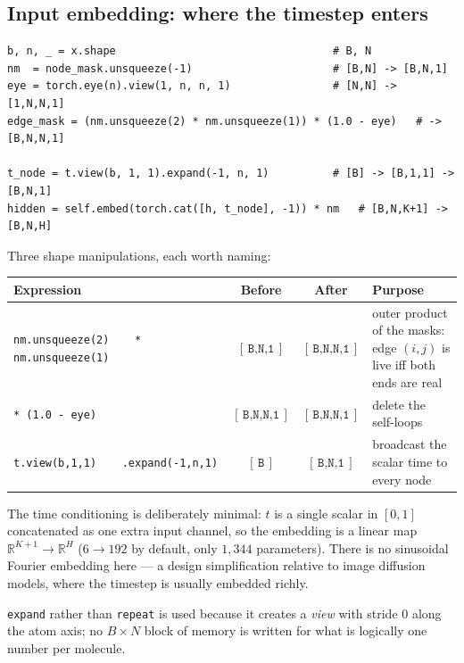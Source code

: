 \documentclass[11pt,a4paper]{article}
\newcommand{\shape}[1]{\ensuremath{[\,\texttt{#1}\,]}}
\newcommand{\code}[1]{\texttt{#1}}
\newcommand{\R}{\mathbb{R}}
\begin{document}
\subsection{Input embedding: where the timestep enters}

\begin{lstlisting}[caption={\code{EGNNDynamics.forward} --- masks and embedding}]
b, n, _ = x.shape                                  # B, N
nm  = node_mask.unsqueeze(-1)                      # [B,N] -> [B,N,1]
eye = torch.eye(n).view(1, n, n, 1)                # [N,N] -> [1,N,N,1]
edge_mask = (nm.unsqueeze(2) * nm.unsqueeze(1)) * (1.0 - eye)   # -> [B,N,N,1]

t_node = t.view(b, 1, 1).expand(-1, n, 1)          # [B] -> [B,1,1] -> [B,N,1]
hidden = self.embed(torch.cat([h, t_node], -1)) * nm   # [B,N,K+1] -> [B,N,H]
\end{lstlisting}

\noindent
Three shape manipulations, each worth naming:

\begin{center}\small
\begin{tabular}{@{}lccp{5.1cm}@{}}
\toprule
\textbf{Expression} & \textbf{Before} & \textbf{After} & \textbf{Purpose} \\
\midrule
\code{nm.unsqueeze(2)}\newline\code{\ \ \ \ * nm.unsqueeze(1)} & \shape{B,N,1} & \shape{B,N,N,1} & outer product of the masks: edge $(i,j)$ is live iff both ends are real \\
\addlinespace
\code{* (1.0 - eye)} & \shape{B,N,N,1} & \shape{B,N,N,1} & delete the self-loops \\
\addlinespace
\code{t.view(b,1,1)}\newline\code{\ \ \ \ .expand(-1,n,1)} & \shape{B} & \shape{B,N,1} & broadcast the scalar time to every node \\
\bottomrule
\end{tabular}
\end{center}

\noindent
The time conditioning is deliberately minimal: $t$ is a single scalar in $[0,1]$
concatenated as one extra input channel, so the embedding is a linear map
$\R^{K+1}\!\to\!\R^{H}$ ($6\to192$ by default, only $1{,}344$ parameters). There
is no sinusoidal Fourier embedding here --- a design simplification relative to
image diffusion models, where the timestep is usually embedded richly.

\code{expand} rather than \code{repeat} is used because it creates a
\emph{view} with stride $0$ along the atom axis; no $B\times N$ block of memory
is written for what is logically one number per molecule.
\end{document}
